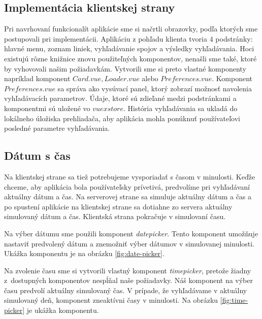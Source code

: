 \subsection{Implementácia klientskej strany} 
Pri navrhovaní funkcionalít aplikácie sme si načrtli obrazovky, podľa ktorých sme postupovali pri implementácii. 
Aplikáciu z pohľadu klienta tvoria 4 podstránky: hlavné menu, zoznam liniek, vyhľadávanie spojov a výsledky vyhľadávania. Hoci existujú rôzne knižnice znovu použiteľných komponentov, nenašli sme také, ktoré by vyhovovali našim požiadavkám. Vytvorili sme si preto vlastné komponenty napríklad komponent $Card.vue, Loader.vue$ alebo $Preferences.vue$. Komponent $Preferences.vue$ sa správa ako vysúvací panel, ktorý zobrazí možnosť navolenia vyhľadávacích parametrov. Údaje, ktoré sú zdieľané medzi podstránkami a komponentmi sú uložené vo $vuex store$. História vyhľadávania sa ukladá do lokálneho úložiska prehliadača, aby aplikácia mohla ponúknuť používateľovi posledné parametre vyhľadávania.


\subsection{Dátum s čas}
Na klientskej strane sa tiež potrebujeme vysporiadať s časom v minulosti. Keďže chceme, aby aplikácia bola používateľsky prívetivá, predvolíme pri vyhľadávaní aktuálny dátum a čas. Na serverovej strane sa simuluje aktuálny dátum a čas a po spustení aplikácie na klientskej strane sa dotiahne zo servera aktuálny simulovaný dátum a čas. Klientská strana pokračuje v simulovaní času. 

Na výber dátumu sme použili komponent \textit{datepicker}. Tento komponent umožňuje nastaviť predvolený dátum a znemožniť výber dátumov v simulovanej minulosti. Ukážka komponentu je na obrázku \ref{fig:date-picker}.

Na zvolenie času sme si vytvorili vlastný komponent \textit{timepicker}, pretože žiadny z~dostupných komponentov nespĺňal naše požiadavky. Náš komponent na výber času predvolí aktuálny simulovaný čas. V prípade, že vyhľadávame v aktuálny simulovaný deň, komponent zneaktívni časy v minulosti. Na obrázku \ref{fig:time-picker} je ukážka komponentu.


